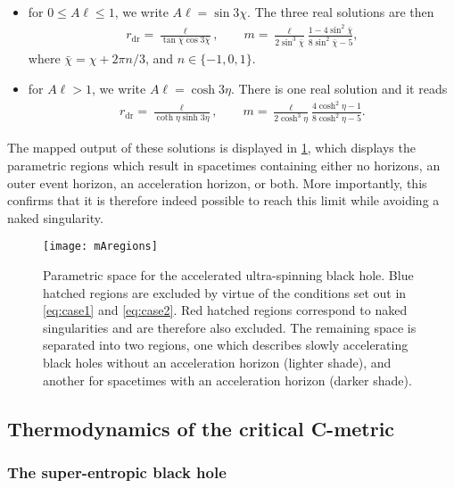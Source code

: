 \documentclass[
twoside,
openright,
frontopenright,
]{dmathesis}
\newcommand{\dr}{\mathrm{dr}}
\begin{document}
\begin{itemize}
\item for $0\leqslant A\ell \leqslant 1$, we write $A\ell=\sin 3\chi$. The three
  real solutions are then
\begin{align}
r_\dr = \frac{\ell}{\tan\bar{\chi}\cos3\bar{\chi}}, \qquad m =
  \frac{\ell}{2\sin^3\bar{\chi}}\frac{1-4\sin^2\bar{\chi}}{8\sin^2\bar{\chi}-5},
\end{align}
where $\bar{\chi} = \chi + 2\pi n/3$, and $n \in \{-1,0,1\}$.
\item for $A\ell > 1$, we write $A\ell=\cosh 3\eta$. There is one real solution
  and it reads
\begin{align}
r_\dr = \frac{\ell}{\coth\eta\sinh 3\eta}, \qquad m =
  \frac{\ell}{2\cosh^3\eta}\frac{4\cosh^2\eta-1}{8\cosh^2\eta-5}. 
\end{align}
\end{itemize}

The mapped output of these solutions is displayed in \cref{fig:horroots}, which
displays the parametric regions which result in spacetimes containing either no
horizons, an outer event horizon, an acceleration horizon, or both. More
importantly, this confirms that it is therefore indeed possible to reach this
limit while avoiding a naked singularity.
 
\begin{figure}
  \centering
  \texttt{[image: mAregions]}
  \caption{\label{fig:horroots}Parametric space for the accelerated ultra-spinning
    black hole. Blue hatched regions are excluded by virtue of the conditions set
    out in \cref{eq:case1} and \cref{eq:case2}. Red hatched regions correspond to
    naked singularities and are therefore also excluded. The remaining space is
    separated into two regions, one which describes slowly accelerating black holes
    without an acceleration horizon (lighter shade), and another for spacetimes with
    an acceleration horizon (darker shade).}
\end{figure}

\subsection{Thermodynamics of the critical C-metric}

\subsubsection{The super-entropic black hole}
\label{sec:uskerr}
\end{document}
